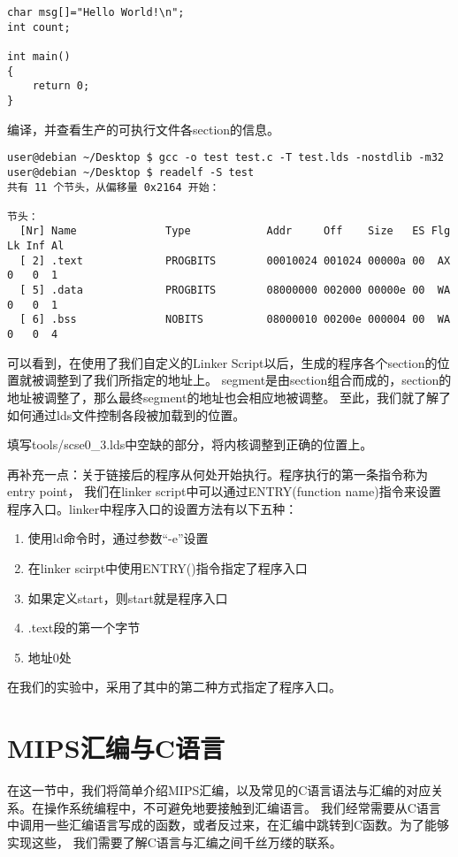 \begin{verbatim}
char msg[]="Hello World!\n";
int count;

int main()
{
    return 0;
}
\end{verbatim}

编译，并查看生产的可执行文件各section的信息。

\begin{verbatim}
user@debian ~/Desktop $ gcc -o test test.c -T test.lds -nostdlib -m32
user@debian ~/Desktop $ readelf -S test                              
共有 11 个节头，从偏移量 0x2164 开始：

节头：
  [Nr] Name              Type            Addr     Off    Size   ES Flg Lk Inf Al
  [ 2] .text             PROGBITS        00010024 001024 00000a 00  AX  0   0  1
  [ 5] .data             PROGBITS        08000000 002000 00000e 00  WA  0   0  1
  [ 6] .bss              NOBITS          08000010 00200e 000004 00  WA  0   0  4
\end{verbatim}

可以看到，在使用了我们自定义的Linker Script以后，生成的程序各个section的位置就被调整到了我们所指定的地址上。
segment是由section组合而成的，section的地址被调整了，那么最终segment的地址也会相应地被调整。
至此，我们就了解了如何通过lds文件控制各段被加载到的位置。

\begin{exercise}
填写tools/scse0\_3.lds中空缺的部分，将内核调整到正确的位置上。
\end{exercise}

再补充一点：关于链接后的程序从何处开始执行。程序执行的第一条指令称为entry point，
我们在linker script中可以通过ENTRY(function name)指令来设置程序入口。linker中程序入口的设置方法有以下五种：
\begin{enumerate}
  \item 使用ld命令时，通过参数“-e”设置
  \item 在linker scirpt中使用ENTRY()指令指定了程序入口
  \item 如果定义start，则start就是程序入口
  \item .text段的第一个字节
  \item 地址0处
\end{enumerate}
在我们的实验中，采用了其中的第二种方式指定了程序入口。

\section{MIPS汇编与C语言}
在这一节中，我们将简单介绍MIPS汇编，以及常见的C语言语法与汇编的对应关系。在操作系统编程中，不可避免地要接触到汇编语言。
我们经常需要从C语言中调用一些汇编语言写成的函数，或者反过来，在汇编中跳转到C函数。为了能够实现这些，
我们需要了解C语言与汇编之间千丝万缕的联系。

